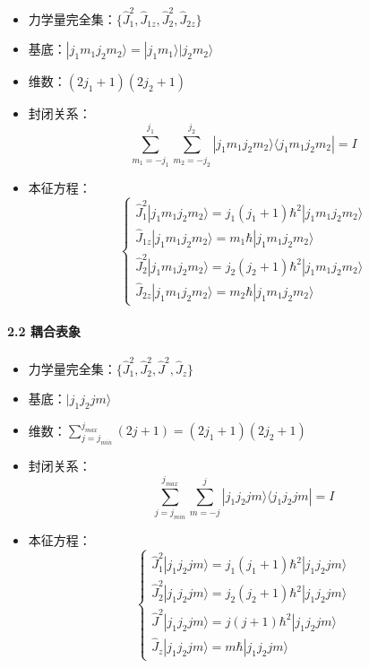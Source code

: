 \documentclass[UTF8,twocolumn]{ctexart}
\providecommand{\tightlist}{%
  \setlength{\itemsep}{0pt}\setlength{\parskip}{0pt}}
\let\oldparagraph\paragraph
\renewcommand{\paragraph}[1]{\oldparagraph{#1}\mbox{}}
\begin{document}
\begin{itemize}
\tightlist
\item
  力学量完全集：\(\{\hat{J}_1^2,\hat{J}_{1z},\hat{J}_2^2,\hat{J}_{2z}\}\)
\item
  基底：\(|j_1m_1j_2m_2\rangle=|j_1m_1\rangle|j_2m_2\rangle\)
\item
  维数：\((2j_1+1)(2j_2+1)\)
\item
  封闭关系：
  \[\sum_{m_1=-j_1}^{j_1}\sum_{m_2=-j_2}^{j_2}|j_1m_1j_2m_2\rangle\langle j_1m_1j_2m_2|=I\]
\item
  本征方程： \[\begin{cases}
  \hat{J}_1^2|j_1m_1j_2m_2\rangle=j_1(j_1+1)\hbar^2|j_1m_1j_2m_2\rangle \\
  \hat{J}_{1z}|j_1m_1j_2m_2\rangle=m_1\hbar|j_1m_1j_2m_2\rangle \\
  \hat{J}_2^2|j_1m_1j_2m_2\rangle=j_2(j_2+1)\hbar^2|j_1m_1j_2m_2\rangle \\
  \hat{J}_{2z}|j_1m_1j_2m_2\rangle=m_2\hbar|j_1m_1j_2m_2\rangle
  \end{cases}\]
\end{itemize}

\hypertarget{ux8026ux5408ux8868ux8c61}{%
\paragraph{ 2.2 耦合表象}\label{ux8026ux5408ux8868ux8c61}}

\begin{itemize}
\tightlist
\item
  力学量完全集：\(\{\hat{J}_1^2,\hat{J}_2^2,\hat{J}^2,\hat{J}_z\}\)
\item
  基底：\(|j_1j_2jm\rangle\)
\item
  维数：\(\sum_{j=j_{min}}^{j_{max}}(2j+1)=(2j_1+1)(2j_2+1)\)
\item
  封闭关系：
  \[\sum_{j=j_{min}}^{j_{max}}\sum_{m=-j}^{j}|j_1j_2jm\rangle\langle j_1j_2jm|=I\]
\item
  本征方程： \[\begin{cases}
  \hat{J}_1^2|j_1j_2jm\rangle=j_1(j_1+1)\hbar^2|j_1j_2jm\rangle \\
  \hat{J}_2^2|j_1j_2jm\rangle=j_2(j_2+1)\hbar^2|j_1j_2jm\rangle \\
  \hat{J}^2|j_1j_2jm\rangle=j(j+1)\hbar^2|j_1j_2jm\rangle \\
  \hat{J}_z|j_1j_2jm\rangle=m\hbar|j_1j_2jm\rangle
  \end{cases}\]
\end{itemize}
\end{document}
